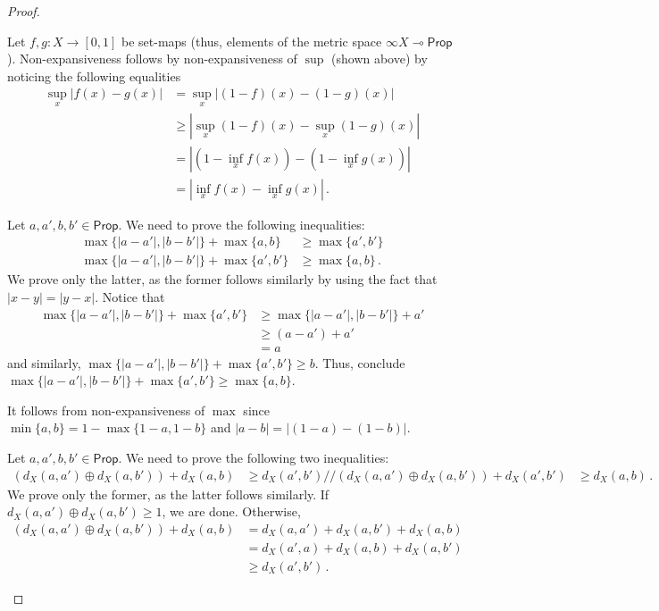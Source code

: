 \documentclass[10pt,a4paper]{amsart}
\newcommand{\Prop}{\mathsf{Prop}}
\newcommand{\lol}{\mathbin{\multimap}}
\newcommand{\mexp}{\lol}
\newcommand{\scaling}{}
\begin{document}
\begin{proof}
\begin{description}[font=\sc,wide]
    \item[Case $\inf$:] 
    Let $f,g \colon X \to [0,1]$ be set-maps (thus, elements of  the metric space $\infty\scaling X \mexp \Prop$). Non-expansiveness follows by non-expansiveness of $\sup$ (shown above) by noticing the following equalities
    \begin{align*}
        \sup_{x} |f(x)-g(x)|
        &= \sup_{x} |(1-f)(x)-(1-g)(x)| \\
        &\geq |\sup_x (1-f)(x) - \sup_x (1-g)(x)| 
        \tag{$\sup$ non-exp} \\
        &= |(1-\inf_x f(x)) - (1 - \inf_x g(x))| \\
        &= |\inf_x f(x) - \inf_x g(x)| \,.
    \end{align*}
    

    \item[Case $\max$:]
    Let $a,a',b,b'\in \Prop$. We need to prove the following inequalities:
    \begin{align*}
        \max\{|a - a'|, |b-b'|\} + \max\{a, b\} &\geq \max\{a', b'\}
        \\%
        \max\{|a - a'|, |b-b'|\} + \max\{a', b'\} &\geq \max\{a, b\} \,.
    \end{align*}
    We prove only the latter, as the former follows similarly by using the fact
    that $|x - y| = |y - x|$.
    Notice that 
    \begin{align*}
        \max\{|a - a'|, |b-b'|\} + \max\{a', b'\}
        &\geq \max\{|a - a'|, |b-b'|\} + a' \\
        &\geq (a-a') + a' \\
        &= a
    \end{align*}
    and similarly, $\max\{|a - a'|, |b-b'|\} + \max\{a', b'\} \geq b$.
    Thus, conclude $\max\{|a - a'|, |b-b'|\} + \max\{a', b'\} \geq \max\{a, b\}$.

    \item[Case $\min$:]
    It follows from non-expansiveness of $\max$ since
    $\min\{a,b\} = 1-\max\{1-a,1-b\}$ and  $|a-b| = |(1-a)-(1-b)|$.

    \item[Case $d_X$:]
    Let $a,a',b,b'\in \Prop$. We need to prove the following two inequalities:
    \begin{align*}
        (d_X(a,a') \oplus d_X(a,b')) + d_X(a,b) &\geq d_X(a',b')
        //%
        (d_X(a,a') \oplus d_X(a,b')) + d_X(a',b') &\geq d_X(a,b) \,.
    \end{align*}
    We prove only the former, as the latter follows similarly.
    If $d_X(a,a') \oplus d_X(a,b') \geq 1$, we are done. Otherwise,
    \begin{align*}
        (d_X(a,a') \oplus d_X(a,b')) + d_X(a,b)
        &= d_X(a,a') + d_X(a,b') + d_X(a,b) \\
        &= d_X(a',a) + d_X(a,b) + d_X(a,b') \tag{symmetry} \\
        &\geq d_X(a',b') \,. \tag{triangular inequality}
    \end{align*}
    
\end{description}
\end{proof}
\end{document}
